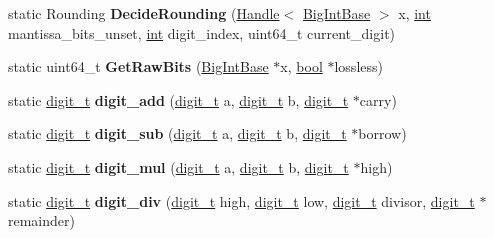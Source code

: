 \begin{DoxyCompactItemize}
\item 
\mbox{\label{classv8_1_1internal_1_1MutableBigInt_aa58728022aaecaf4cea067e88cbd85eb}} 
static Rounding {\bfseries Decide\+Rounding} (\mbox{\hyperlink{classv8_1_1internal_1_1Handle}{Handle}}$<$ \mbox{\hyperlink{classv8_1_1internal_1_1BigIntBase}{Big\+Int\+Base}} $>$ x, \mbox{\hyperlink{classint}{int}} mantissa\+\_\+bits\+\_\+unset, \mbox{\hyperlink{classint}{int}} digit\+\_\+index, uint64\+\_\+t current\+\_\+digit)
\item 
\mbox{\label{classv8_1_1internal_1_1MutableBigInt_ad33ee7338cd03eb02fbf5c714a43c124}} 
static uint64\+\_\+t {\bfseries Get\+Raw\+Bits} (\mbox{\hyperlink{classv8_1_1internal_1_1BigIntBase}{Big\+Int\+Base}} $\ast$x, \mbox{\hyperlink{classbool}{bool}} $\ast$lossless)
\item 
\mbox{\label{classv8_1_1internal_1_1MutableBigInt_a699f474aa8a76f953db35b6e86c418e6}} 
static \mbox{\hyperlink{classuintptr__t}{digit\+\_\+t}} {\bfseries digit\+\_\+add} (\mbox{\hyperlink{classuintptr__t}{digit\+\_\+t}} a, \mbox{\hyperlink{classuintptr__t}{digit\+\_\+t}} b, \mbox{\hyperlink{classuintptr__t}{digit\+\_\+t}} $\ast$carry)
\item 
\mbox{\label{classv8_1_1internal_1_1MutableBigInt_a7092bdd96494691e71e9da460865fc12}} 
static \mbox{\hyperlink{classuintptr__t}{digit\+\_\+t}} {\bfseries digit\+\_\+sub} (\mbox{\hyperlink{classuintptr__t}{digit\+\_\+t}} a, \mbox{\hyperlink{classuintptr__t}{digit\+\_\+t}} b, \mbox{\hyperlink{classuintptr__t}{digit\+\_\+t}} $\ast$borrow)
\item 
\mbox{\label{classv8_1_1internal_1_1MutableBigInt_a697cbaafaa4c1ed6a593f7372ede952c}} 
static \mbox{\hyperlink{classuintptr__t}{digit\+\_\+t}} {\bfseries digit\+\_\+mul} (\mbox{\hyperlink{classuintptr__t}{digit\+\_\+t}} a, \mbox{\hyperlink{classuintptr__t}{digit\+\_\+t}} b, \mbox{\hyperlink{classuintptr__t}{digit\+\_\+t}} $\ast$high)
\item 
\mbox{\label{classv8_1_1internal_1_1MutableBigInt_ade9bdbeb2b01d819be984fdf2dbd102f}} 
static \mbox{\hyperlink{classuintptr__t}{digit\+\_\+t}} {\bfseries digit\+\_\+div} (\mbox{\hyperlink{classuintptr__t}{digit\+\_\+t}} high, \mbox{\hyperlink{classuintptr__t}{digit\+\_\+t}} low, \mbox{\hyperlink{classuintptr__t}{digit\+\_\+t}} divisor, \mbox{\hyperlink{classuintptr__t}{digit\+\_\+t}} $\ast$remainder)

\end{DoxyCompactItemize}
